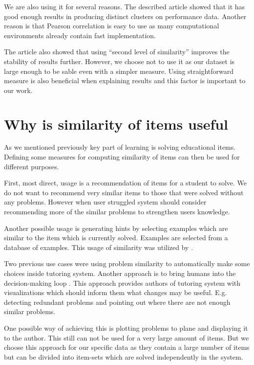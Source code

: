 \documentclass[
  digital, %
  table,   %
  nolof,     %
  nolot,     %
  nocover,
  color
]{fithesis3}
\begin{document}
We are also using it for several reasons. The described article showed that it has good enough results in producing distinct clusters on performance data. Another reason is that Pearson correlation is easy to use as many computational environments already contain fast implementation.

The article also showed that using ``second level of similarity'' improves the stability of results further. However, we choose not to use it as our dataset is large enough to be sable even with a simpler measure. Using straightforward measure is also beneficial when explaining results and this factor is important to our work.

\section{Why is similarity of items useful}\label{why-is-similarity-of-items-useful}


As we mentioned previously key part of learning is solving educational items. Defining some measures for computing similarity of items can then be used for different purposes.

First, most direct, usage is a recommendation of items for a student to solve. We do not want to recommend very similar items to those that were solved without any problems. However when user struggled system should consider recommending more of the similar problems to strengthen users knowledge.

Another possible usage is generating hints by selecting examples which are similar to the item which is currently solved. Examples are selected from a database of examples. This usage of similarity was utilized by \citeauthor{hosseini2017study}\cite{hosseini2017study}.

Two previous use cases were using problem similarity to automatically make some choices inside tutoring system. Another approach is to bring humans into the decision-making loop \cite{baker2016stupid}. This approach provides authors of tutoring system with visualizations which should inform them what changes may be useful. E.g. detecting redundant problems and pointing out where there are not enough similar problems.

One possible way of achieving this is plotting problems to plane and displaying it to the author. This still can not be used for a very large amount of items. But we choose this approach for our specific data as they contain a large number of items but can be divided into item-sets which are solved independently in the system.
\end{document}
